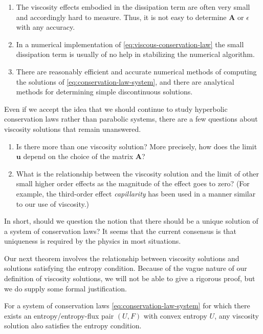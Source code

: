 \begin{enumerate}
\item The viscosity effects embodied in the dissipation term are often very small and accordingly hard to measure. Thus, it is not easy to determine $\bm{A}$ or $\epsilon$ with any accuracy.
\item In a numerical implementation of \eqref{eq:viscous-conservation-law} the small dissipation term is usually of no help in stabilizing the numerical algorithm.
\item There are reasonably efficient and accurate numerical methods of computing the solutions of \eqref{eq:conservation-law-system}, and there are analytical methods for determining simple discontinuous solutions.
\end{enumerate}

Even if we accept the idea that we should continue to study hyperbolic conservation laws rather than parabolic systems, there are a few questions about viscosity solutions that remain unanswered.
\begin{enumerate}
\item Is there more than one viscosity solution? More precisely, how does the limit $\bm{u}$ depend on the choice of the matrix $\bm{A}$?
\item What is the relationship between the viscosity solution and the limit of other small higher order effects as the magnitude of the effect goes to zero? (For example, the third-order effect \emph{capillarity} has been used in a manner similar to our use of viscosity.)
\end{enumerate}
In short, should we question the notion that there should be a unique solution of a system of conservation laws? It seems that the current consensus is that uniqueness is required by the physics in most situations.

Our next theorem involves the relationship between viscosity solutions and solutions satisfying the entropy condition. Because of the vague nature of our definition of viscosity solutions, we will not be able to give a rigorous proof, but we do supply some formal justification.

\begin{Theorem}
\label{thm:viscosity-implies-entropy}
For a system of conservation laws \eqref{eq:conservation-law-system} for which there exists an entropy/entropy-flux pair $(U,F)$ with convex entropy $U$, any viscosity solution also satisfies the entropy condition.
\end{Theorem}

